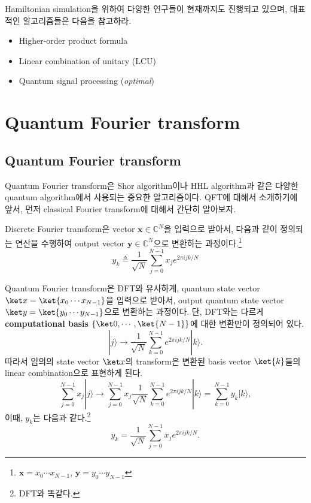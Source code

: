Hamiltonian simulation을 위하여 다양한 연구들이 현재까지도 진행되고 있으며, 대표적인 알고리즘들은 다음을 참고하라.
\begin{itemize}
  \item Higher-order product formula \cite{childs2021theory}
  \item Linear combination of unitary (LCU) \cite{berry2015hamiltonian}
  \item Quantum signal processing (\textit{optimal}) \cite{haah2019product}
\end{itemize}

\section{Quantum Fourier transform}
\subsection{Quantum Fourier transform}
Quantum Fourier transform은 Shor algorithm이나 HHL algorithm과 같은 다양한 quantum algorithm에서 사용되는 중요한 알고리즘이다.
QFT에 대해서 소개하기에 앞서, 먼저 classical Fourier transform에 대해서 간단히 알아보자.

\begin{definition}
  Discrete Fourier transform은 vector $\mathbf x \in \mathbb C^N$을 입력으로 받아서, 다음과 같이 정의되는 연산을 수행하여 output vector $\mathbf y \in \mathbb C^N$으로 변환하는 과정이다.\footnote{$\mathbf x = x_0\cdots x_{N-1}$, $\mathbf y = y_0\cdots y_{N-1}$ }
  $$ y_k \triangleq \frac{1}{\sqrt{N}} \sum_{j=0}^{N-1} x_j e^{2 \pi i j k / N} $$
\end{definition}

\begin{definition}\label{def:QFT}
  Quantum Fourier transform은 DFT와 유사하게, quantum state vector $\ket x = \ket{x_0\cdots x_{N-1}}$을 입력으로 받아서, output quantum state vector $\ket y  =\ket{ y_0\cdots y_{N-1}}$으로 변환하는 과정이다. 
  단, DFT와는 다르게 \textbf{computational basis} $\{\ket 0, \cdots, \ket{N-1}\}$에 대한 변환만이 정의되어 있다.
  $$
    |j\rangle \rightarrow \frac{1}{\sqrt{N}} \sum_{k=0}^{N-1} e^{2 \pi i j k / N}|k\rangle .
  $$
  따라서 임의의 state vector $\ket x$의 transform은 변환된 basis vector $\ket{k}$들의 linear combination으로 표현하게 된다.
  $$
    \sum_{j=0}^{N-1} x_j|j\rangle \rightarrow \sum_{j=0}^{N-1} x_j \frac{1}{\sqrt{N}} \sum_{k=0}^{N-1} e^{2 \pi i j k / N}|k\rangle=\sum_{k=0}^{N-1} y_k|k\rangle,
  $$
  이때, $y_k$는 다음과 같다.\footnote{DFT와 똑같다.}
  $$
    y_k=\frac{1}{\sqrt{N}} \sum_{j=0}^{N-1} x_j e^{2 \pi i j k / N}.
  $$
\end{definition}

